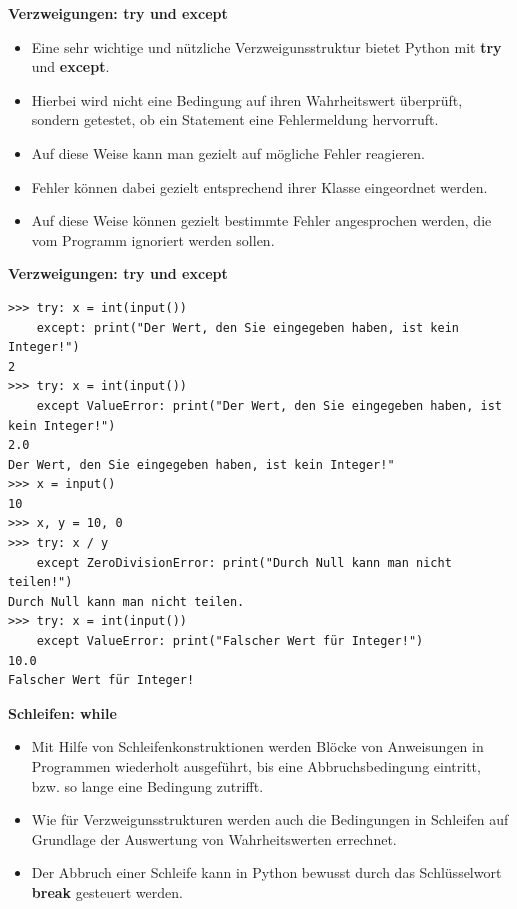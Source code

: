 \vspace{0.5cm}\par\noindent\textbf{Verzweigungen: try und except}\vspace{0.5cm}

\begin{itemize}
\itemsep1pt\parskip0pt
\item
  {Eine sehr wichtige und nützliche Verzweigunsstruktur bietet Python
  mit \textbf{try} und \textbf{except}.}
\item
  {Hierbei wird nicht eine Bedingung auf ihren Wahrheitswert überprüft,
  sondern getestet, ob ein Statement eine Fehlermeldung hervorruft.}
\item
  {Auf diese Weise kann man gezielt auf mögliche Fehler reagieren.}
\item
  {Fehler können dabei gezielt entsprechend ihrer Klasse eingeordnet
  werden.}
\item
  {Auf diese Weise können gezielt bestimmte Fehler angesprochen werden,
  die vom Programm ignoriert werden sollen.}
\end{itemize}



\vspace{0.5cm}\par\noindent\textbf{Verzweigungen: try und except}\vspace{0.5cm}

\begin{verbatim}
>>> try: x = int(input())
    except: print("Der Wert, den Sie eingegeben haben, ist kein Integer!")
2
>>> try: x = int(input())
    except ValueError: print("Der Wert, den Sie eingegeben haben, ist kein Integer!")
2.0
Der Wert, den Sie eingegeben haben, ist kein Integer!"
>>> x = input()
10
>>> x, y = 10, 0 
>>> try: x / y
    except ZeroDivisionError: print("Durch Null kann man nicht teilen!")
Durch Null kann man nicht teilen.
>>> try: x = int(input())
    except ValueError: print("Falscher Wert für Integer!")
10.0
Falscher Wert für Integer!
\end{verbatim}


\vspace{0.5cm}\par\noindent\textbf{Schleifen: while}\vspace{0.5cm}

\begin{itemize}
\itemsep1pt\parskip0pt
\item
  {Mit Hilfe von Schleifenkonstruktionen werden Blöcke von Anweisungen
  in Programmen wiederholt ausgeführt, bis eine Abbruchsbedingung
  eintritt, bzw. so lange eine Bedingung zutrifft.}
\item
  {Wie für Verzweigunsstrukturen werden auch die Bedingungen in
  Schleifen auf Grundlage der Auswertung von Wahrheitswerten errechnet.}
\item
  {Der Abbruch einer Schleife kann in Python bewusst durch das
  Schlüsselwort \textbf{break} gesteuert werden.}
\end{itemize}





